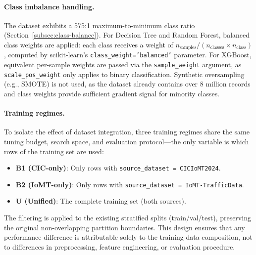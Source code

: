 \paragraph{Class imbalance handling.}
The dataset exhibits a 575:1 maximum-to-minimum class ratio (Section~\ref{subsec:class-balance}). For Decision Tree and Random Forest, balanced class weights are applied: each class receives a weight of $n_{\text{samples}} / (n_{\text{classes}} \times n_{\text{class}})$, computed by scikit-learn's \texttt{class\_weight='balanced'} parameter. For XGBoost, equivalent per-sample weights are passed via the \texttt{sample\_weight} argument, as \texttt{scale\_pos\_weight} only applies to binary classification. Synthetic oversampling (e.g., SMOTE) is not used, as the dataset already contains over 8 million records and class weights provide sufficient gradient signal for minority classes.

\paragraph{Training regimes.}
To isolate the effect of dataset integration, three training regimes share the same tuning budget, search space, and evaluation protocol---the only variable is which rows of the training set are used:

\begin{itemize}[nosep]
  \item \textbf{B1 (CIC-only)}: Only rows with \texttt{source\_dataset = CICIoMT2024}.
  \item \textbf{B2 (IoMT-only)}: Only rows with \texttt{source\_dataset = IoMT-TrafficData}.
  \item \textbf{U (Unified)}: The complete training set (both sources).
\end{itemize}

The filtering is applied to the existing stratified splits (train/val/test), preserving the original non-overlapping partition boundaries. This design ensures that any performance difference is attributable solely to the training data composition, not to differences in preprocessing, feature engineering, or evaluation procedure.

